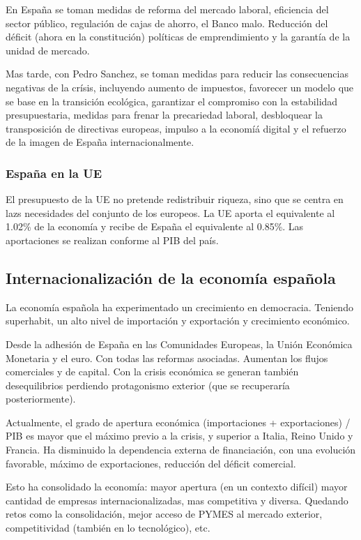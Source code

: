             En España se toman medidas de reforma del mercado laboral, eficiencia del sector público, regulación de cajas de ahorro, el Banco malo. Reducción del déficit (ahora en la constitución) políticas de emprendimiento y la garantía de la unidad de mercado.

            Mas tarde, con Pedro Sanchez, se toman medidas para reducir las consecuencias negativas de la crísis, incluyendo aumento de impuestos, favorecer un modelo que se base en la transición ecológica, garantizar el compromiso con la estabilidad presupuestaria, medidas para frenar la precariedad laboral, desbloquear la transposición de directivas europeas, impulso a la economíá digital y el refuerzo de la imagen de España internacionalmente.

    \subsubsection{España en la UE}
        El presupuesto de la UE no pretende redistribuir riqueza, sino que se centra en lazs necesidades del conjunto de los europeos. La UE aporta el equivalente al 1.02\% de la economía y recibe de España el equivalente al 0.85\%. Las aportaciones se realizan conforme al PIB del país.

\subsection{Internacionalización de la economía española} %
    La economía española ha experimentado un crecimiento en democracia. Teniendo superhabit, un alto nivel de importación y exportación y crecimiento económico.

    Desde la adhesión de España en las Comunidades Europeas, la Unión Económica Monetaria y el euro. Con todas las reformas asociadas. Aumentan los flujos comerciales y de capital. Con la crisis económica se generan también desequilibrios perdiendo protagonismo exterior (que se recuperaría posteriormente).

    Actualmente, el grado de apertura económica (importaciones + exportaciones) / PIB es mayor que el máximo previo a la crisis, y superior a Italia, Reino Unido y Francia. Ha disminuido la dependencia externa de financiación, con una evolución favorable, máximo de exportaciones, reducción del déficit comercial.

    Esto ha consolidado la economía: mayor apertura (en un contexto difícil) mayor cantidad de empresas internacionalizadas, mas competitiva y diversa. Quedando retos como la consolidación, mejor acceso de PYMES al mercado exterior, competitividad (también en lo tecnológico), etc.

